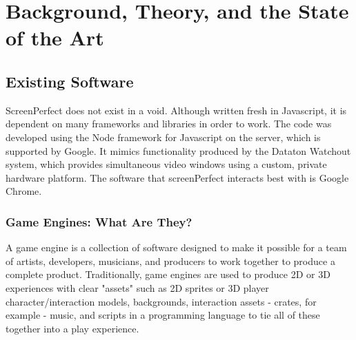 
\chapter{Background, Theory, and the State of the Art} %

\label{Chapter2} %




\section{Existing Software}
ScreenPerfect does not exist in a void. Although written fresh in Javascript, it is dependent on many frameworks and libraries in order to work. The code was developed using the Node framework for Javascript on the server, which is supported by Google. It mimics functionality produced by the Dataton Watchout system, which provides simultaneous video windows using a custom, private hardware platform. The software that screenPerfect interacts best with is Google Chrome.

\subsection{Game Engines: What Are They?}

A game engine is a collection of software designed to make it possible for a team of artists, developers, musicians, and producers to work together to produce a complete product. Traditionally, game engines are used to produce 2D or 3D experiences with clear "assets" such as 2D sprites or 3D player character/interaction models, backgrounds, interaction assets - crates, for example - music, and scripts in a programming language to tie all of these together into a play experience.

